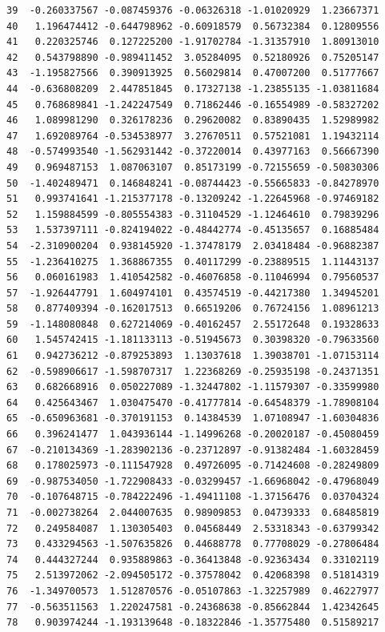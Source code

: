 \documentclass[
  letterpaper,
  DIV=11,
  numbers=noendperiod]{scrreprt}
\begin{document}
\begin{verbatim}
39  -0.260337567 -0.087459376 -0.06326318 -1.01020929  1.23667371
40   1.196474412 -0.644798962 -0.60918579  0.56732384  0.12809556
41   0.220325746  0.127225200 -1.91702784 -1.31357910  1.80913010
42   0.543798890 -0.989411452  3.05284095  0.52180926  0.75205147
43  -1.195827566  0.390913925  0.56029814  0.47007200  0.51777667
44  -0.636808209  2.447851845  0.17327138 -1.23855135 -1.03811684
45   0.768689841 -1.242247549  0.71862446 -0.16554989 -0.58327202
46   1.089981290  0.326178236  0.29620082  0.83890435  1.52989982
47   1.692089764 -0.534538977  3.27670511  0.57521081  1.19432114
48  -0.574993540 -1.562931442 -0.37220014  0.43977163  0.56667390
49   0.969487153  1.087063107  0.85173199 -0.72155659 -0.50830306
50  -1.402489471  0.146848241 -0.08744423 -0.55665833 -0.84278970
51   0.993741641 -1.215377178 -0.13209242 -1.22645968 -0.97469182
52   1.159884599 -0.805554383 -0.31104529 -1.12464610  0.79839296
53   1.537397111 -0.824194022 -0.48442774 -0.45135657  0.16885484
54  -2.310900204  0.938145920 -1.37478179  2.03418484 -0.96882387
55  -1.236410275  1.368867355  0.40117299 -0.23889515  1.11443137
56   0.060161983  1.410542582 -0.46076858 -0.11046994  0.79560537
57  -1.926447791  1.604974101  0.43574519 -0.44217380  1.34945201
58   0.877409394 -0.162017513  0.66519206  0.76724156  1.08961213
59  -1.148080848  0.627214069 -0.40162457  2.55172648  0.19328633
60   1.545742415 -1.181133113 -0.51945673  0.30398320 -0.79633560
61   0.942736212 -0.879253893  1.13037618  1.39038701 -1.07153114
62  -0.598906617 -1.598707317  1.22368269 -0.25935198 -0.24371351
63   0.682668916  0.050227089 -1.32447802 -1.11579307 -0.33599980
64   0.425643467  1.030475470 -0.41777814 -0.64548379 -1.78908104
65  -0.650963681 -0.370191153  0.14384539  1.07108947 -1.60304836
66   0.396241477  1.043936144 -1.14996268 -0.20020187 -0.45080459
67  -0.210134369 -1.283902136 -0.23712897 -0.91382484 -1.60328459
68   0.178025973 -0.111547928  0.49726095 -0.71424608 -0.28249809
69  -0.987534050 -1.722908433 -0.03299457 -1.66968042 -0.47968049
70  -0.107648715 -0.784222496 -1.49411108 -1.37156476  0.03704324
71  -0.002738264  2.044007635  0.98909853  0.04739333  0.68485819
72   0.249584087  1.130305403  0.04568449  2.53318343 -0.63799342
73   0.433294563 -1.507635826  0.44688778  0.77708029 -0.27806484
74   0.444327244  0.935889863 -0.36413848 -0.92363434  0.33102119
75   2.513972062 -2.094505172 -0.37578042  0.42068398  0.51814319
76  -1.349700573  1.512870576 -0.05107863 -1.32257989  0.46227977
77  -0.563511563  1.220247581 -0.24368638 -0.85662844  1.42342645
78   0.903974244 -1.193139648 -0.18322846 -1.35775480  0.51589217

\end{verbatim}
\end{document}
